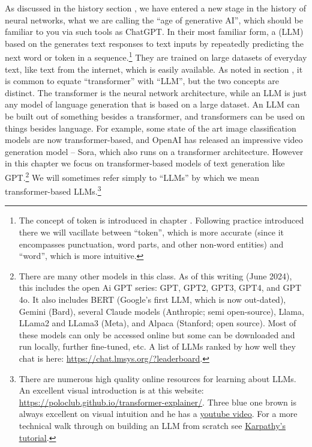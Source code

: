 As discussed in the history section , we have entered a new stage in the history of neural networks, what we are calling the ``age of generative AI'', which should be familiar to you via such tools as ChatGPT. In their most familiar form, a  (LLM) based on the  generates text responses to text inputs by repeatedly predicting the next word or token in a sequence.\footnote{The concept of token is introduced in chapter . Following practice introduced there we will vacillate between ``token'', which is more accurate (since it encompasses punctuation, word parts, and other non-word entities) and ``word'', which is more intuitive.} They are trained on large datasets of everyday text, like text from the internet, which is easily available. As noted in section , it is common to equate ``transformer'' with ``LLM'', but the two concepts are distinct. The transformer is the neural network architecture, while an LLM is just any model of language generation that is based on a large dataset. An LLM can be built out of something besides a transformer, and transformers can be used on things besides language. For example, some state of the art image classification models are now transformer-based, and OpenAI has released an impressive video generation model – Sora, which also runs on a transformer architecture. However in this chapter we focus on transformer-based models of text generation like GPT.\footnote{There are many other models in this class. As of this writing (June 2024), this includes the open Ai GPT series: GPT, GPT2, GPT3, GPT4, and GPT 4o. It also includes BERT (Google’s first LLM, which is now out-dated), Gemini (Bard), several Claude models (Anthropic;  semi open-source), Llama, LLama2 and LLama3 (Meta), and Alpaca (Stanford; open source). Most of these models can only be accessed online but some can be downloaded and run locally, further fine-tuned, etc. A list of LLMs ranked by how well they chat is here: \url{https://chat.lmsys.org/?leaderboard}.} We will sometimes refer simply to ``LLMs'' by which we mean transformer-based LLMs.\footnote{There are numerous high quality online resources for learning about LLMs. An excellent visual introduction is at this website: \url{https://poloclub.github.io/transformer-explainer/}. Three blue one brown is always excellent on visual intuition and he has a \href{https://www.youtube.com/watch?v=wjZofJX0v4M&list=PLZHQObOWTQDNU6R1_67000Dx_ZCJB-3pi}{\underline{youtube video}}. For a more technical walk through on building an LLM from scratch see \href{https://www.youtube.com/watch?v=kCc8FmEb1nY}{\underline{Karpathy's tutorial}}.}

